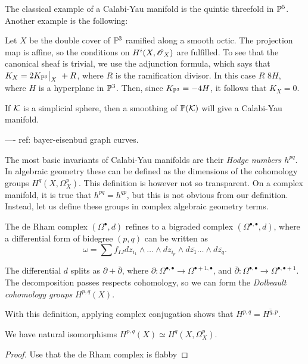 The classical example of a Calabi-Yau manifold is the quintic threefold in $\mathbb{P}^5$. Another example is the following:

\begin{example}
Let $X$ be the double cover of $\mathbb{P}^3$ ramified along a smooth octic. The projection map is affine, so the conditions on $H^i(X,\operatorname{\mathscr{O}}_X)$ are fulfilled. To see that the canonical sheaf is trivial, we use the adjunction formula, which says that $K_X= 2 \restr{K_{\PP^3}}{X} + R$, where $R$ is the ramification divisor. In this case $R$ $8H$, where $H$ is a hyperplane in $\mathbb{P}^3$. Then, since $K_{\mathbb{P}^3}=-4H$, it follows that $K_X=0$.
\end{example}

If $\mathcal K$ is a simplicial sphere, then a smoothing of $\mathbb{P}(\mathcal K)$ will give a Calabi-Yau manifold.


---- ref: bayer-eisenbud graph curves.

The most basic invariants of Calabi-Yau manifolds are their \emph{Hodge numbers $h^{pq}$}. In algebraic geometry these can be defined as the dimensions of the cohomology groups $H^q(X,\Omega^p_X)$. This definition is however not so transparent. On a complex manifold, it is true that $h^{pq}=h^{qp}$, but this is not obvious from our definition. Instead, let us define these groups in complex algebraic geometry terms.

The de Rham complex $(\Omega^\bullet,d)$ refines to a bigraded complex $(\Omega^{\bullet,\bullet},d)$, where a differential form of bidegree $(p,q)$ can be written as 
$$
\omega = \sum {f_{IJ}} dz_{i_1} \wedge \ldots \wedge dz_{i_p} \wedge d\overline{z_1}\ldots \wedge d\overline{z_q}.
$$

The differential $d$ splits as $\partial + \overline \partial$, where $\partial: \Omega^{\bullet,\bullet} \to \Omega^{\bullet+1,\bullet}$, and $\overline \partial: \Omega^{\bullet,\bullet} \to \Omega^{\bullet,\bullet+1}$. The decomposition passes respects cohomology, so we can form the \emph{Dolbeault cohomology groups} $H^{p,q}(X)$. 

With this definition, applying complex conjugation shows that $H^{p,q}=\overline{H^{q,p}}$.

\begin{lemma}
We have natural isomorphisms $H^{p,q}(X) \simeq H^q(X,\Omega_X^p)$. 
\end{lemma}
\begin{proof}
Use that the de Rham complex is flabby
\end{proof}

